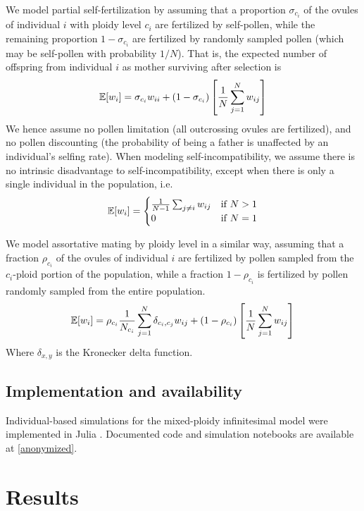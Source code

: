 \documentclass[12pt,a4paper]{article}
\begin{document}
We model partial self-fertilization by assuming that a proportion
$\sigma_{c_i}$ of the ovules of individual $i$ with ploidy level $c_i$ are
fertilized by self-pollen, while the remaining proportion $1-\sigma_{c_i}$ are
fertilized by randomly sampled pollen (which may be self-pollen with
probability $1/N$). 
That is, the expected number of offspring from individual $i$ as mother
surviving after selection is
\begin{equation}
\mathbb{E}[w_i] = \sigma_{c_i} w_{ii} +
  (1-\sigma_{c_i})\left[\frac{1}{N}\sum_{j=1}^N w_{ij}\right]
\end{equation}
We hence assume no pollen limitation (all outcrossing ovules are fertilized),
and no pollen discounting (the probability of being a father is unaffected by
an individual's selfing rate).
When modeling self-incompatibility, we assume there is no intrinsic
disadvantage to self-incompatibility, except when there is only a single
individual in the population, i.e.
\begin{equation}
\mathbb{E}[w_i] = \begin{cases}
    \frac{1}{N-1}\sum_{j \ne i }w_{ij} & \text{if } N > 1\\ 
    0 & \text{if } N=1 \end{cases}
\end{equation}

We model assortative mating by ploidy level in a similar way, assuming that a
fraction $\rho_{c_i}$ of the ovules of individual $i$ are fertilized by pollen
sampled from the $c_i$-ploid portion of the population, while a fraction
$1-\rho_{c_i}$ is fertilized by pollen randomly sampled from the entire
population.
\begin{equation}
\mathbb{E}[w_i] = \rho_{c_i} \frac{1}{N_{c_{i}}} \sum_{j=1}^N \delta_{c_i,c_j}w_{ij}
 + (1-\rho_{c_i})
\left[\frac{1}{N}\sum_{j=1}^N w_{ij}\right]
\end{equation}
Where $\delta_{x,y}$ is the Kronecker delta function.

\subsection*{Implementation and availability}

Individual-based simulations for the mixed-ploidy infinitesimal model were
implemented in Julia \citep{julia}.
Documented code and simulation notebooks are available at
\url{[anonymized]}.

\section*{Results}
\end{document}
